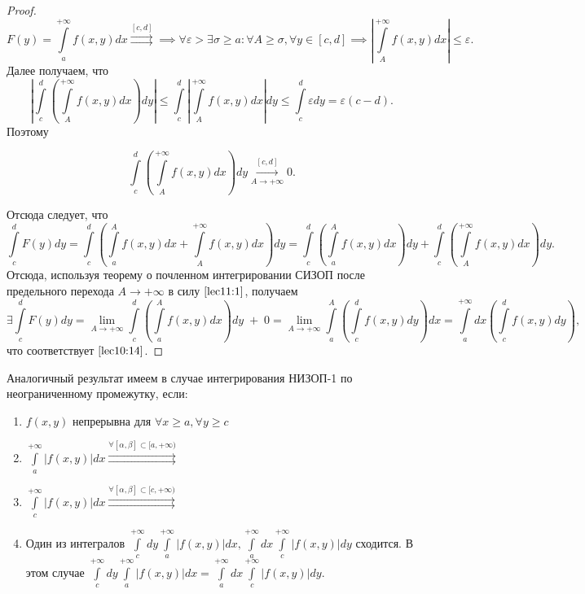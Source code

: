 \documentclass[../../main.tex]{subfiles}
\begin{document}
\begin{proof}
	$$F(y) = \int\limits_a^{+\infty} f(x, y)dx \overset{[c, d]}\rightrightarrows \implies
	\forall \varepsilon > \exists \sigma \geq a: \forall A \geq \sigma, \forall y \in [c, d] \implies \left|\int\limits_A^{+\infty}f(x, y) dx \right| \leq \varepsilon.$$ 
	Далее получаем, что 
	$$ \left| \int\limits_c^d\left(\int\limits_A^{+\infty}f(x, y)dx\right) dy\right| 
	\leq \int\limits_c^d\left|\int\limits_A^{+\infty}f(x, y)dx\right| dy
	\leq \int\limits_c^d \varepsilon dy = \varepsilon(c - d).$$
	Поэтому 
	
	\begin{equation} \label{lec11:1}
		\int\limits_c^d \left( \int\limits_A^{+\infty} f(x, y) dx \right) dy \overset{[c, d]}{\underset{A \rightarrow +\infty}\longrightarrow} 0.
	\end{equation}
	
	Отсюда следует, что
	$$
	\int\limits_c^d F(y)dy = \int\limits_c^d \left( \int\limits_a^A f(x, y)dx + \int\limits_A^{+\infty} f(x, y) dx \right) dy = \int\limits_c^d \left( \int\limits_a^A f(x, y) dx \right) dy + \int\limits_c^d \left( \int\limits_A^{+\infty} f(x, y) dx \right) dy.
	$$
	Отсюда, используя теорему о почленном интегрировании СИЗОП после предельного перехода $A \longrightarrow +\infty$ в силу $\eqref{lec11:1}$, получаем 
	$$
	\exists \int\limits_c^d F(y) dy = \lim_{A \rightarrow +\infty} \int\limits_c^d \left( \int\limits_a^A f(x, y) dx \right) dy \; + \; 0 
	= \lim_{A \rightarrow +\infty} \int\limits_a^A \left( \int\limits_c^d f(x, y) dy \right) dx 
	= \int\limits_a^{+\infty} dx \left( \int\limits_c^d f(x, y) dy \right),
	$$ что соответствует $\eqref{lec10:14}$.
\end{proof}

\begin{rem}
	Аналогичный результат имеем в случае интегрирования НИЗОП-1 по неограниченному промежутку, если:
	\begin{enumerate}
		\item $\displaystyle f(x, y)$ непрерывна для $\forall x \geq a, \forall y \geq c$
		\item $\displaystyle \int\limits_a^{+\infty} \left| f(x, y) \right| dx \overset{\forall [\alpha, \beta] \subset [a, +\infty) }\rightrightarrows$
		\item $\displaystyle \int\limits_c^{+\infty} \left| f(x, y) \right| dx \overset{\forall [\alpha, \beta] \subset [c, +\infty) }\rightrightarrows$
		\item Один из интегралов $\displaystyle \int\limits_c^{+\infty} dy \int\limits_a^{+\infty} \left|f(x, y)\right| dx,
		\int\limits_a^{+\infty} dx \int\limits_c^{+\infty} \left|f(x, y)\right| dy$
		сходится. В этом случае
		$\displaystyle \int\limits_c^{+\infty} dy \int\limits_a^{+\infty} \left|f(x, y)\right| dx = \int\limits_a^{+\infty} dx \int\limits_c^{+\infty} \left|f(x, y)\right| dy$.
	\end{enumerate}
\end{rem}
\end{document}
